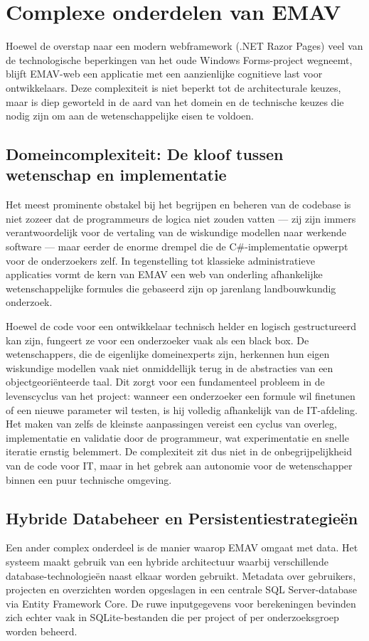 \chapter{Complexe onderdelen van EMAV}
\label{ch:projectcomplexiteit}

Hoewel de overstap naar een modern webframework (.NET Razor Pages) veel van de technologische beperkingen van het oude Windows Forms-project wegneemt, blijft EMAV-web een applicatie met een aanzienlijke cognitieve last voor ontwikkelaars. Deze complexiteit is niet beperkt tot de architecturale keuzes, maar is diep geworteld in de aard van het domein en de technische keuzes die nodig zijn om aan de wetenschappelijke eisen te voldoen.

\section{Domeincomplexiteit: De kloof tussen wetenschap en implementatie}
Het meest prominente obstakel bij het begrijpen en beheren van de codebase is niet zozeer dat de programmeurs de logica niet zouden vatten — zij zijn immers verantwoordelijk voor de vertaling van de wiskundige modellen naar werkende software — maar eerder de enorme drempel die de C\#-implementatie opwerpt voor de onderzoekers zelf. In tegenstelling tot klassieke administratieve applicaties vormt de kern van EMAV een web van onderling afhankelijke wetenschappelijke formules die gebaseerd zijn op jarenlang landbouwkundig onderzoek.

Hoewel de code voor een ontwikkelaar technisch helder en logisch gestructureerd kan zijn, fungeert ze voor een onderzoeker vaak als een black box. De wetenschappers, die de eigenlijke domeinexperts zijn, herkennen hun eigen wiskundige modellen vaak niet onmiddellijk terug in de abstracties van een objectgeoriënteerde taal. Dit zorgt voor een fundamenteel probleem in de levenscyclus van het project: wanneer een onderzoeker een formule wil finetunen of een nieuwe parameter wil testen, is hij volledig afhankelijk van de IT-afdeling. Het maken van zelfs de kleinste aanpassingen vereist een cyclus van overleg, implementatie en validatie door de programmeur, wat experimentatie en snelle iteratie ernstig belemmert. De complexiteit zit dus niet in de onbegrijpelijkheid van de code voor IT, maar in het gebrek aan autonomie voor de wetenschapper binnen een puur technische omgeving.

\section{Hybride Databeheer en Persistentiestrategieën}
{\sloppy Een ander complex onderdeel is de manier waarop EMAV omgaat met data. Het systeem maakt gebruik van een hybride architectuur waarbij verschillende database-technologieën naast elkaar worden gebruikt. Metadata over gebruikers, projecten en overzichten worden opgeslagen in een centrale SQL Server-database via Entity Framework Core. De ruwe inputgegevens voor berekeningen bevinden zich echter vaak in SQLite-bestanden die per project of per onderzoeksgroep worden beheerd.\par}

